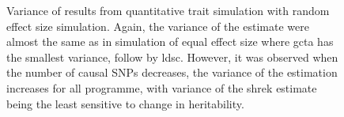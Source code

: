 \begin{figure}
{				
				\label{fig:ldscInQtRandVar}
			}
			\caption[Quantitative Trait with Random Effect Size Simulation Result(Variance)]
			{Variance of results from quantitative trait simulation with random effect size simulation.
				Again, the variance of the estimate were almost the same as in simulation of equal effect size where \gls{gcta} has the smallest variance, follow by \gls{ldsc}. 
				However, it was observed when the number of causal \glspl{SNP} decreases, the variance of the estimation increases for all programme, with variance of the \gls{shrek} estimate being the least sensitive to change in heritability.
			} 
			\label{fig:QtRandVar}
		\end{figure}
		
